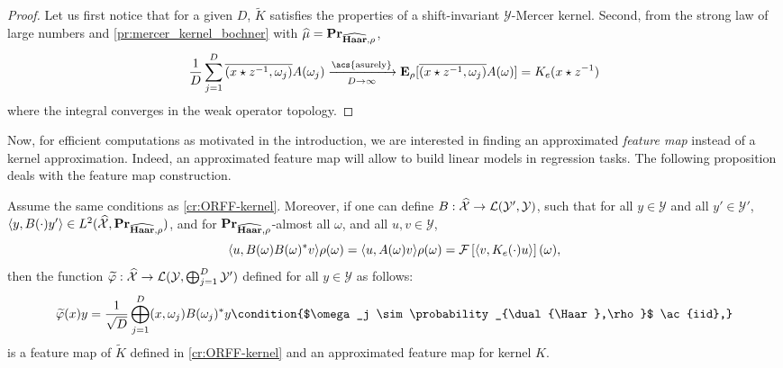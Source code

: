\begin{proof}
    Let us first notice that for a given $D$, $\tilde{K}$ satisfies the
    properties of a shift-invariant $\mathcal{Y}$-Mercer kernel.  Second, from
    the strong law of large numbers and \cref{pr:mercer_kernel_bochner} with
    $\widehat{\mu}={\mathbf{{Pr}}}_{\widehat{\mathbf{Haar}},\rho}$,
    \begin{dmath*}
        \frac{1}{D} \sum_{j=1}^D \conj{\pairing{x\groupop\inv{z},\omega_j}}
        A(\omega_j) \converges{\acs{asurely}}{D \to \infty}
        \expectation_{\rho}[\conj{\pairing{x \groupop z^{-1}, \omega_j}
        }A(\omega)] 
        =K_e(x\groupop\inv{z})
    \end{dmath*}
    where the integral converges in the weak operator topology.
\end{proof}
Now, for efficient computations as motivated in the introduction, we are
interested in finding an approximated \emph{feature map} instead of a kernel
approximation. Indeed, an approximated feature map will allow to build linear
models in regression tasks. The following proposition deals with the feature
map construction.
\begin{proposition}
    \label{cr:ORFF-map-kernel} Assume the same conditions as
    \cref{cr:ORFF-kernel}. Moreover, if one can define $B: \widehat{\mathcal{X}}
    \to \mathcal{L}(\mathcal{Y}',\mathcal{Y})$, such that for all
    $y\in\mathcal{Y}$ and all $y' \in\mathcal{Y}'$, $\langle y, B(\cdot)y'\rangle \in
    L^2(\widehat{\mathcal{X}}, {\mathbf{{Pr}}}_{\widehat{\mathbf{Haar}},\rho})$,  and for
    ${\mathbf{{Pr}}}_{\widehat{\mathbf{Haar}},\rho}$-almost all $\omega$, and all $u,
    v\in\mathcal{Y}$,
    \begin{dmath*}
        \inner{u, B(\omega)B(\omega)^\adjoint v}\rho(\omega)= \inner{u,
        A(\omega)v}\rho(\omega)= \FT{\inner{v, K_e(\cdot)u}}(\omega),
    \end{dmath*}
    then the function $\tildePhi{\omega}:\dual{\mathcal{X}} \to
    \mathcal{L}(\mathcal{Y}, \Vect_{j=1}^D \mathcal{Y'})$ defined for all $y
    \in \mathcal{Y}$ as
    follows: \begin{dmath*}
        \tildePhi{\omega}(x)y
        = \frac{1}{\sqrt{D}}\Vect_{j=1}^D\pairing{x,
        \omega_j}B(\omega_j)^\adjoint y \condition{$\omega_j \sim
        \probability_{\dual{\Haar},\rho}$ \ac{iid},}
    \end{dmath*}
is a feature map of $\tilde{K}$ defined in \cref{cr:ORFF-kernel} and an
approximated feature map for kernel $K$.
\end{proposition}
